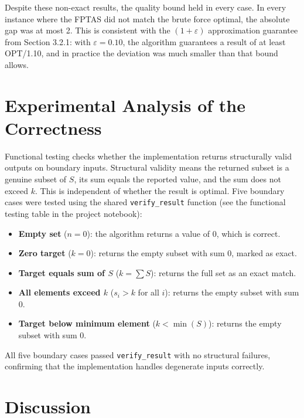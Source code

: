 \documentclass[12pt,a4paper]{article}
\theoremstyle{definition}
\begin{document}
Despite these non-exact results, the quality bound held in every case. In every instance where the FPTAS did not match the brute force optimal, the absolute gap was at most 2. This is consistent with the $(1+\varepsilon)$ approximation guarantee from Section 3.2.1: with $\varepsilon = 0.10$, the algorithm guarantees a result of at least OPT/1.10, and in practice the deviation was much smaller than that bound allows.

\section{Experimental Analysis of the Correctness}

Functional testing checks whether the implementation returns structurally valid outputs on boundary inputs. Structural validity means the returned subset is a genuine subset of $S$, its sum equals the reported value, and the sum does not exceed $k$. This is independent of whether the result is optimal. Five boundary cases were tested using the shared \texttt{verify\_result} function (see the functional testing table in the project notebook):

\begin{itemize}[noitemsep]
    \item \textbf{Empty set} ($n = 0$): the algorithm returns a value of 0, which is correct.
    \item \textbf{Zero target} ($k = 0$): returns the empty subset with sum 0, marked as exact.
    \item \textbf{Target equals sum of $S$} ($k = \sum S$): returns the full set as an exact match.
    \item \textbf{All elements exceed $k$} ($s_i > k$ for all $i$): returns the empty subset with sum 0.
    \item \textbf{Target below minimum element} ($k < \min(S)$): returns the empty subset with sum 0.
\end{itemize}

All five boundary cases passed \texttt{verify\_result} with no structural failures, confirming that the implementation handles degenerate inputs correctly.

\section{Discussion}
\end{document}

